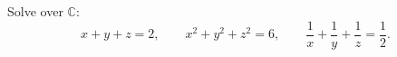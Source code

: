 Solve over $\mathbb C$:
\[x+y+z=2,\qquad x^2+y^2+z^2=6,\qquad \dfrac{1}{x}+\dfrac{1}{y}+\dfrac{1}{z}=\dfrac{1}{2}.\]
